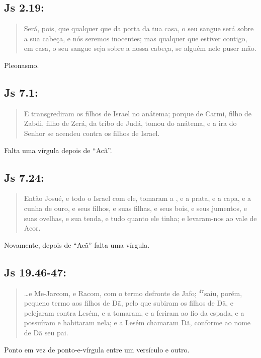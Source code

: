 \subsection{Js 2.19:}
\begin{quote}
    \small
Será, pois, que qualquer que  da porta da tua casa, o seu sangue será sobre a sua cabeça, e nós seremos inocentes; mas qualquer que estiver contigo, em casa, o seu sangue seja sobre a nossa cabeça, se alguém nele puser mão.
\end{quote}
Pleonasmo.

\subsection{Js 7.1:}
\begin{quote}
    \small
    E transgrediram os filhos de Israel no anátema; porque  de Carmi, filho de Zabdi, filho de Zerá, da tribo de Judá, tomou do anátema, e a ira do Senhor se acendeu contra os filhos de Israel.
\end{quote}

Falta uma vírgula depois de ``Acã''.

\subsection{Js 7.24:}
\begin{quote}
    \small
  Então Josué, e todo o Israel com ele, tomaram a , e a prata, e a capa, e a cunha de ouro, e seus filhos, e suas filhas, e seus bois, e seus jumentos, e suas ovelhas, e sua tenda, e tudo quanto ele tinha; e levaram-nos ao vale de Acor.  
\end{quote}

Novamente, depois de ``Acã'' falta uma vírgula.

\subsection{Js 19.46-47:}
\begin{quote}
    \small
\ldots e Me-Jarcom, e Racom, com o termo defronte de Jafo\uline{;} $^{\mathrm{47}}$saiu, porém, pequeno termo aos filhos de Dã, pelo que subiram os filhos de Dã, e pelejaram contra Lesém, e a tomaram, e a feriram ao fio da espada, e a possuíram e habitaram nela; e a Lesém chamaram Dã, conforme ao nome de Dã seu pai.    
\end{quote}

Ponto em vez de ponto-e-vírgula entre um versículo e outro.

